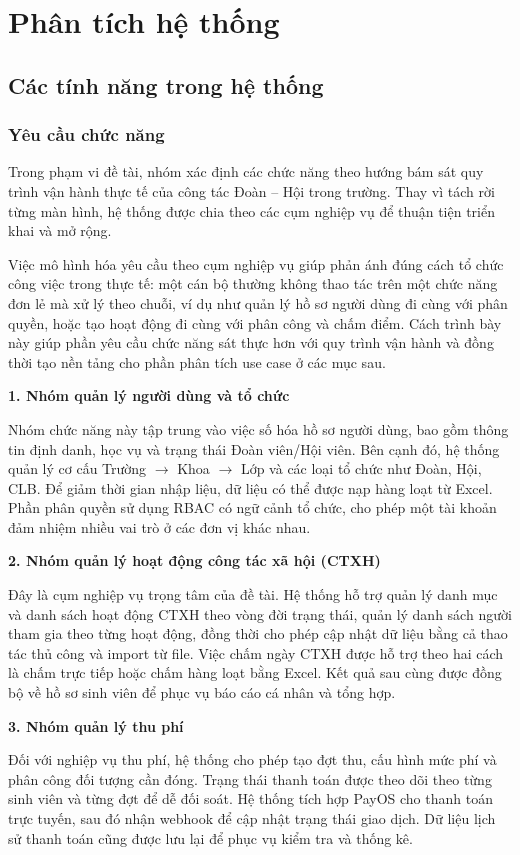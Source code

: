 \section{Phân tích hệ thống}
\subsection{Các tính năng trong hệ thống}
\subsubsection{Yêu cầu chức năng}
Trong phạm vi đề tài, nhóm xác định các chức năng theo hướng bám sát quy trình vận hành thực tế của công tác Đoàn -- Hội trong trường. Thay vì tách rời từng màn hình, hệ thống được chia theo các cụm nghiệp vụ để thuận tiện triển khai và mở rộng.

Việc mô hình hóa yêu cầu theo cụm nghiệp vụ giúp phản ánh đúng cách tổ chức công việc trong thực tế: một cán bộ thường không thao tác trên một chức năng đơn lẻ mà xử lý theo chuỗi, ví dụ như quản lý hồ sơ người dùng đi cùng với phân quyền, hoặc tạo hoạt động đi cùng với phân công và chấm điểm. Cách trình bày này giúp phần yêu cầu chức năng sát thực hơn với quy trình vận hành và đồng thời tạo nền tảng cho phần phân tích use case ở các mục sau.

\textbf{1. Nhóm quản lý người dùng và tổ chức}\par
Nhóm chức năng này tập trung vào việc số hóa hồ sơ người dùng, bao gồm thông tin định danh, học vụ và trạng thái Đoàn viên/Hội viên. Bên cạnh đó, hệ thống quản lý cơ cấu Trường $\rightarrow$ Khoa $\rightarrow$ Lớp và các loại tổ chức như Đoàn, Hội, CLB. Để giảm thời gian nhập liệu, dữ liệu có thể được nạp hàng loạt từ Excel. Phần phân quyền sử dụng RBAC có ngữ cảnh tổ chức, cho phép một tài khoản đảm nhiệm nhiều vai trò ở các đơn vị khác nhau.

\textbf{2. Nhóm quản lý hoạt động công tác xã hội (CTXH)}\par
Đây là cụm nghiệp vụ trọng tâm của đề tài. Hệ thống hỗ trợ quản lý danh mục và danh sách hoạt động CTXH theo vòng đời trạng thái, quản lý danh sách người tham gia theo từng hoạt động, đồng thời cho phép cập nhật dữ liệu bằng cả thao tác thủ công và import từ file. Việc chấm ngày CTXH được hỗ trợ theo hai cách là chấm trực tiếp hoặc chấm hàng loạt bằng Excel. Kết quả sau cùng được đồng bộ về hồ sơ sinh viên để phục vụ báo cáo cá nhân và tổng hợp.

\textbf{3. Nhóm quản lý thu phí}\par
Đối với nghiệp vụ thu phí, hệ thống cho phép tạo đợt thu, cấu hình mức phí và phân công đối tượng cần đóng. Trạng thái thanh toán được theo dõi theo từng sinh viên và từng đợt để dễ đối soát. Hệ thống tích hợp PayOS cho thanh toán trực tuyến, sau đó nhận webhook để cập nhật trạng thái giao dịch. Dữ liệu lịch sử thanh toán cũng được lưu lại để phục vụ kiểm tra và thống kê.

